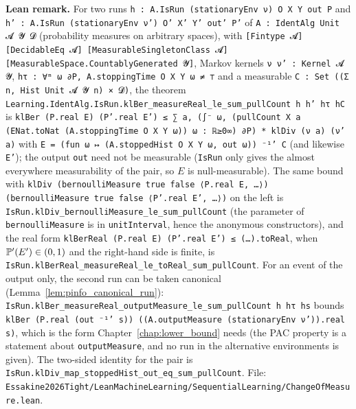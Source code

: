 \textbf{Lean remark.} For two runs \texttt{h : A.IsRun (stationaryEnv ν) O X Y out P} and
\texttt{h' : A.IsRun (stationaryEnv ν') O' X' Y' out' P'} of \texttt{A : IdentAlg Unit 𝓐 𝓨 𝓓}
(probability measures on arbitrary spaces), with \texttt{[Fintype 𝓐] [DecidableEq 𝓐]
[MeasurableSingletonClass 𝓐] [MeasurableSpace.CountablyGenerated 𝓨]}, Markov kernels
\texttt{ν ν' : Kernel 𝓐 𝓨}, \texttt{hτ : ∀ᵐ ω ∂P, A.stoppingTime O X Y ω ≠ ⊤} and a measurable
\texttt{C : Set ((Σ n, Hist Unit 𝓐 𝓨 n) × 𝓓)}, the theorem
\texttt{Learning.IdentAlg.IsRun.klBer\_measureReal\_le\_sum\_pullCount h h' hτ hC} is
\texttt{klBer (P.real E) (P'.real E') ≤ ∑ a, (∫⁻ ω, (pullCount X a (ENat.toNat
(A.stoppingTime O X Y ω)) ω : ℝ≥0∞) ∂P) * klDiv (ν a) (ν' a)} with
\texttt{E = (fun ω ↦ (A.stoppedHist O X Y ω, out ω)) ⁻¹' C} (and likewise \texttt{E'}); the output
\texttt{out} need not be measurable (\texttt{IsRun} only gives the almost everywhere
measurability of the pair, so $E$ is null-measurable). The same bound with
\texttt{klDiv (bernoulliMeasure true false ⟨P.real E, …⟩) (bernoulliMeasure true false ⟨P'.real E', …⟩)}
on the left is \texttt{IsRun.klDiv\_bernoulliMeasure\_le\_sum\_pullCount} (the parameter of
\texttt{bernoulliMeasure} is in \texttt{unitInterval}, hence the anonymous constructors), and the
real form \texttt{klBerReal (P.real E) (P'.real E') ≤ (…).toReal}, when $\mathbb{P}'(E') \in (0,1)$ and
the right-hand side is finite, is \texttt{IsRun.klBerReal\_measureReal\_le\_toReal\_sum\_pullCount}.
For an event of the output only, the second run can be taken canonical
(Lemma~\ref{lem:pinfo_canonical_run}):
\texttt{IsRun.klBer\_measureReal\_outputMeasure\_le\_sum\_pullCount h hτ hs} bounds
\texttt{klBer (P.real (out ⁻¹' s)) ((A.outputMeasure (stationaryEnv ν')).real s)}, which is the
form Chapter~\ref{chap:lower_bound} needs (the PAC property is a statement about
\texttt{outputMeasure}, and no run in the alternative environments is given). The two-sided
identity for the pair is \texttt{IsRun.klDiv\_map\_stoppedHist\_out\_eq\_sum\_pullCount}. File:
\texttt{Essakine2026Tight/LeanMachineLearning/SequentialLearning/ChangeOfMeasure.lean}.

